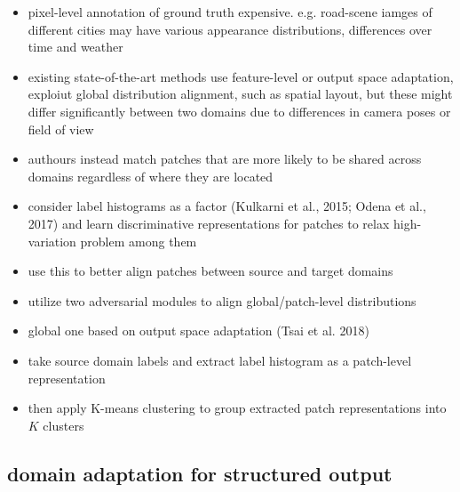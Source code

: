 \begin{itemize}
	\item pixel-level annotation of ground truth expensive. e.g. road-scene iamges of different cities may have various appearance distributions, differences over time and weather
	\item existing state-of-the-art methods use feature-level or output space adaptation, exploiut global distribution alignment, such as spatial layout, but these might differ significantly between two domains due to differences in camera poses or field of view
	\item authours instead match patches that are more likely to be shared across domains regardless of where they are located
	\item consider label histograms as a factor (Kulkarni et al., 2015; Odena et al., 2017) and learn discriminative representations for patches to relax high-variation problem among them
	\item use this to better align patches between source and target domains
	\item utilize two adversarial modules to align global/patch-level distributions
	\item global one based on output space adaptation (Tsai et al. 2018)
	\item take source domain labels and extract label histogram as a patch-level representation
	\item then apply K-means clustering to group extracted patch representations into $K$ clusters 
\end{itemize}

\subsection{domain adaptation for structured output}

